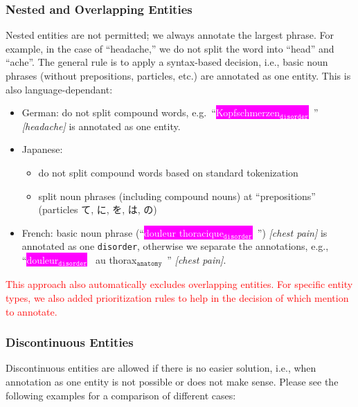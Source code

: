 \documentclass[12pt]{article}
\theoremstyle{definition}
\newcommand{\anatomy}[1]{\colorbox{dollarbill}{#1$_{\texttt{anatomy}}$}\ }
\newcommand{\disorder}[1]{\colorbox{fuchsia}{\textcolor{white}{#1$_{\texttt{disorder}}$}}\ }
\newcommand{\dis}{\texttt{disorder}\xspace}
\begin{document}
\subsubsection*{Nested and Overlapping Entities}

Nested entities are not permitted; we always annotate the largest phrase.
For example, in the case of ``headache,'' we do not split the word into ``head'' and ``ache''. 
The general rule is to apply a syntax-based decision, i.e., basic noun phrases (without prepositions, particles, etc.) are annotated as one entity.
This is also language-dependant:

\begin{itemize}
    \item German: do not split compound words, e.g.~``\disorder{Kopfschmerzen}'' \textit{[headache]} is annotated as one entity.
    \item Japanese: 
    \begin{itemize}
        \item do not split compound words based on standard tokenization
        \item split noun phrases (including compound nouns) at ``prepositions'' (particles て, に, を, は, の)
    \end{itemize}
    
    \item French: basic noun phrase (``\disorder{douleur thoracique}'') \textit{[chest pain]} is annotated as one \dis, otherwise we separate the annotations, e.g., ``\disorder{douleur} au \anatomy{thorax}'' \textit{[chest pain]}.
\end{itemize}
\textcolor{red}{This approach also automatically excludes overlapping entities. For specific entity types, we also added prioritization rules to help in the decision of which mention to annotate.}

\subsubsection*{Discontinuous Entities}

Discontinuous entities are allowed if there is no easier solution, i.e., when annotation as one entity is not possible or does not make sense. 
Please see the following examples for a comparison of different cases:
\end{document}
